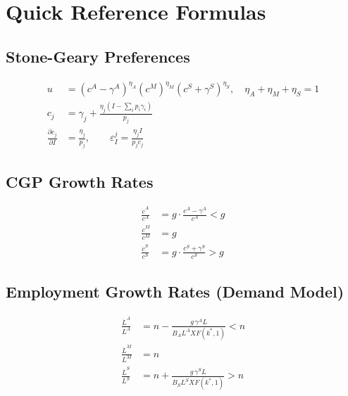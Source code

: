 \documentclass[a4paper,11pt]{article}
\begin{document}
\clearpage

\section{Quick Reference Formulas}

\subsection*{Stone-Geary Preferences}
\begin{align*}
u &= (c^A - \gamma^A)^{\eta_A} (c^M)^{\eta_M} (c^S + \gamma^S)^{\eta_S}, \quad \eta_A + \eta_M + \eta_S = 1 \tag{Utility}\\
c_j &= \gamma_j + \frac{\eta_j (I - \sum_i p_i \gamma_i)}{p_j} \tag{Demand}\\
\frac{\partial c_j}{\partial I} &= \frac{\eta_j}{p_j}, \qquad \varepsilon_I^j = \frac{\eta_j I}{p_j c_j} \tag{Engel Curve}
\end{align*}

\subsection*{CGP Growth Rates}
\begin{align*}
\frac{\dot{c}^A}{c^A} &= g \cdot \frac{c^A - \gamma^A}{c^A} < g \tag{Agriculture}\\
\frac{\dot{c}^M}{c^M} &= g \tag{Manufacturing}\\
\frac{\dot{c}^S}{c^S} &= g \cdot \frac{c^S + \gamma^S}{c^S} > g \tag{Services}
\end{align*}

\subsection*{Employment Growth Rates (Demand Model)}
\begin{align*}
\frac{\dot{L}^A}{L^A} &= n - \frac{g\, \gamma^A L}{B_A L^A X F(k^*,1)} < n \tag{Agriculture}\\
\frac{\dot{L}^M}{L^M} &= n \tag{Manufacturing}\\
\frac{\dot{L}^S}{L^S} &= n + \frac{g\, \gamma^S L}{B_S L^S X F(k^*,1)} > n \tag{Services}
\end{align*}
\end{document}
